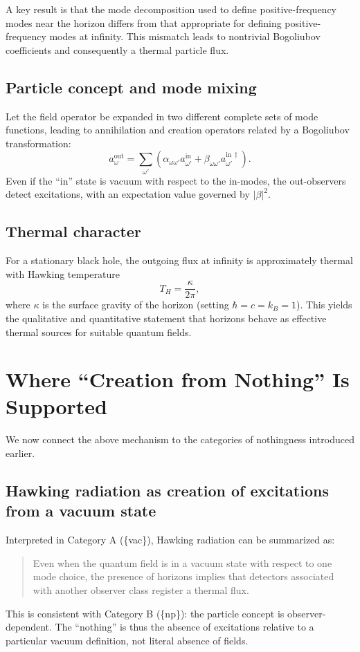 \documentclass[11pt,a4paper]{article}
\begin{document}
A key result is that the mode decomposition used to define positive-frequency modes near the horizon differs from that appropriate for defining positive-frequency modes at infinity. This mismatch leads to nontrivial Bogoliubov coefficients and consequently a thermal particle flux.

\subsection{Particle concept and mode mixing}
Let the field operator be expanded in two different complete sets of mode functions, leading to annihilation and creation operators related by a Bogoliubov transformation:
\begin{equation}
a_{\omega}^{\mathrm{out}} = \sum_{\omega'} \left( \alpha_{\omega\omega'} a_{\omega'}^{\mathrm{in}} + \beta_{\omega\omega'} a_{\omega'}^{\mathrm{in}\,\dagger} \right).
\end{equation}
Even if the ``in'' state is vacuum with respect to the in-modes, the out-observers detect excitations, with an expectation value governed by $|\beta|^2$.

\subsection{Thermal character}
For a stationary black hole, the outgoing flux at infinity is approximately thermal with Hawking temperature
\begin{equation}
T_H = \frac{\kappa}{2\pi},
\end{equation}
where $\kappa$ is the surface gravity of the horizon (setting $\hbar=c=k_B=1$). This yields the qualitative and quantitative statement that horizons behave as effective thermal sources for suitable quantum fields.

\section{Where ``Creation from Nothing'' Is Supported}
We now connect the above mechanism to the categories of nothingness introduced earlier.

\subsection{Hawking radiation as creation of excitations from a vacuum state}
Interpreted in Category A (\{vac\}), Hawking radiation can be summarized as:
\begin{quote}
Even when the quantum field is in a vacuum state with respect to one mode choice, the presence of horizons implies that detectors associated with another observer class register a thermal flux.
\end{quote}
This is consistent with Category B (\{np\}): the particle concept is observer-dependent. The ``nothing'' is thus the absence of excitations relative to a particular vacuum definition, not literal absence of fields.
\end{document}
